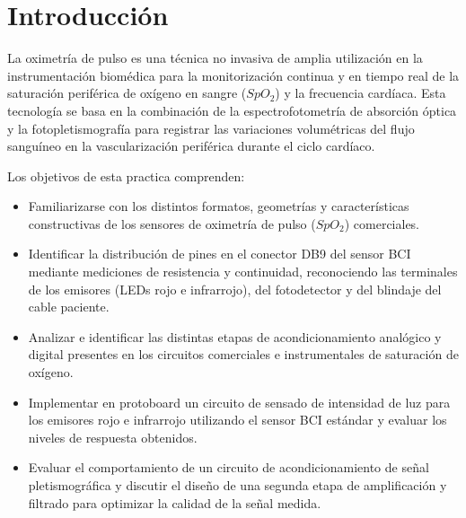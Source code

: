 \section{Introducción}
La oximetría de pulso es una técnica no invasiva de amplia utilización en la instrumentación biomédica para la monitorización continua y en tiempo real de la saturación periférica de oxígeno en sangre ($SpO_2$) y la frecuencia cardíaca. Esta tecnología se basa en la combinación de la espectrofotometría de absorción óptica y la fotopletismografía para registrar las variaciones volumétricas del flujo sanguíneo en la vascularización periférica durante el ciclo cardíaco.

Los objetivos de esta practica comprenden:
\begin{itemize}
    \item Familiarizarse con los distintos formatos, geometrías y características constructivas de los sensores de oximetría de pulso ($SpO_2$) comerciales.
    \item Identificar la distribución de pines en el conector DB9 del sensor BCI mediante mediciones de resistencia y continuidad, reconociendo las terminales de los emisores (LEDs rojo e infrarrojo), del fotodetector y del blindaje del cable paciente.
    \item Analizar e identificar las distintas etapas de acondicionamiento analógico y digital presentes en los circuitos comerciales e instrumentales de saturación de oxígeno.
    \item Implementar en protoboard un circuito de sensado de intensidad de luz para los emisores rojo e infrarrojo utilizando el sensor BCI estándar y evaluar los niveles de respuesta obtenidos.
    \item Evaluar el comportamiento de un circuito de acondicionamiento de señal pletismográfica y discutir el diseño de una segunda etapa de amplificación y filtrado para optimizar la calidad de la señal medida.
\end{itemize}
